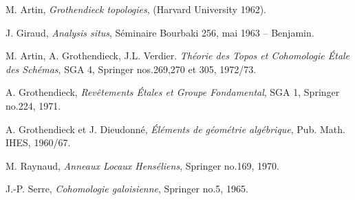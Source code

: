 \documentclass{article}
\begin{document}
\begin{thebibliography}{ab}
   M. Artin, \emph{Grothendieck topologies}, (Harvard University 1962).

   J. Giraud, \emph{Analysis situs}, Séminaire Bourbaki 256, mai 1963 -- Benjamin. 

   M. Artin, A. Grothendieck, J.L. Verdier. \emph{Théorie des Topos et Cohomologie Étale des Schémas}, SGA 4, Springer nos.269,270 et 305, 1972/73.

   A. Grothendieck, \emph{Revêtements Étales et Groupe Fondamental}, SGA 1, Springer no.224, 1971.
  
   A. Grothendieck et J. Dieudonné, \emph{Éléments de géométrie algébrique}, Pub. Math. IHES, 1960/67. 

   M. Raynaud, \emph{Anneaux Locaux Henséliens}, Springer no.169, 1970. 

   J.-P. Serre, \emph{Cohomologie galoisienne}, Springer no.5, 1965.

\end{thebibliography}
\end{document}
